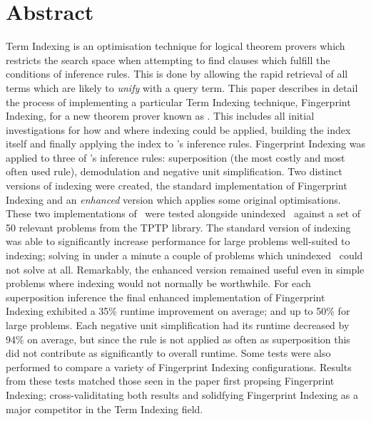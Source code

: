 
\chapter*{Abstract}
\label{cha:abstract}

Term Indexing is an optimisation technique for logical theorem provers which
restricts the search space when attempting to find clauses which fulfill the conditions
of inference rules. This is done by allowing the rapid retrieval of all terms which
are likely to \emph{unify} with a query term. This paper describes in detail
the process of implementing a particular Term Indexing technique, Fingerprint
Indexing, for a new theorem prover known as \beagle. This includes all initial investigations
for how and where indexing could be applied, building the index itself and finally applying the
index to \beagle's inference rules.
Fingerprint Indexing was applied to three of \beagle's inference rules: superposition (the most costly and most often used rule),
demodulation and negative unit simplification. Two distinct versions of indexing were
created, the standard implementation of Fingerprint Indexing and an \emph{enhanced}
version which applies some original optimisations.
These two implementations of \beagle\ were tested alongside unindexed \beagle\ 
against a set of 50 relevant problems from the TPTP library. The standard version
of indexing was able to significantly increase performance for large problems well-suited to indexing;
solving in under a minute a couple of problems which unindexed \beagle\ could not solve at all.
Remarkably, the enhanced version remained useful even in simple problems where indexing would
not normally be worthwhile.
For each superposition inference the final enhanced implementation of Fingerprint Indexing exhibited a
35\% runtime improvement on average; and up to 50\% for large problems.
Each negative unit simplification had its runtime decreased by 94\% on average,
but since the rule is not applied as often as superposition this did not contribute as
significantly to overall runtime. Some tests were also performed to compare
a variety of Fingerprint Indexing configurations. Results from these tests
matched those seen in the paper first propsing Fingerprint Indexing; cross-validitating
both results and solidfying Fingerprint Indexing as a major competitor
in the Term Indexing field.


